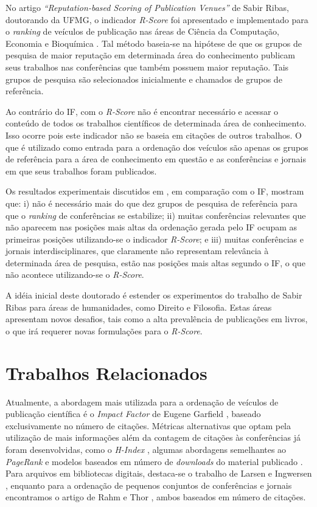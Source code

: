 \documentclass[a4paper,12pt,titlepage]{article}
\begin{document}
No artigo \textit{``Reputation-based Scoring of Publication Venues''} de Sabir Ribas, doutorando da UFMG, o indicador \textit{R-Score} foi apresentado e implementado para o \textit{ranking} de veículos de publicação nas áreas de Ciência da Computação, Economia e Bioquímica \cite{sabir}. Tal método baseia-se na hipótese de que os grupos de pesquisa de maior reputação em determinada área do conhecimento publicam seus trabalhos nas conferências que também possuem maior reputação. Tais grupos de pesquisa são selecionados inicialmente e chamados de grupos de referência. 

Ao contrário do IF, com o \textit{R-Score} não é encontrar necessário e acessar o conteúdo de todos os trabalhos científicos de determinada área de conhecimento. Isso ocorre pois este indicador não se baseia em citações de outros trabalhos. O que é utilizado como entrada para a ordenação dos veículos são apenas os grupos de referência para a área de conhecimento em questão e as conferências e jornais em que seus trabalhos foram publicados.

Os resultados experimentais discutidos em \cite{sabir}, em comparação com o IF, mostram que: i) não é necessário mais do que dez grupos de pesquisa de referência para que o \textit{ranking} de conferências se estabilize; ii) muitas conferências relevantes que não aparecem nas posições mais altas da ordenação gerada pelo IF ocupam as primeiras posições utilizando-se o indicador \textit{R-Score}; e iii) muitas conferências e jornais interdisciplinares, que claramente não representam relevância à determinada área de pesquisa, estão nas posições mais altas segundo o IF, o que não acontece utilizando-se o \textit{R-Score}.

A idéia inicial deste doutorado é estender os experimentos do trabalho de Sabir Ribas para áreas de humanidades, como Direito e Filosofia. Estas áreas apresentam novos desafios, tais como a alta prevalência de publicações em livros, o que irá requerer novas formulações para o \textit{R-Score}.

\section{Trabalhos Relacionados} 
Atualmente, a abordagem mais utilizada para a ordenação de veículos de publicação científica é o \textit{Impact Factor} de Eugene Garfield \cite{if}, baseado exclusivamente no número de citações. Métricas alternativas que optam pela utilização de mais informações além da contagem de citações às conferências já foram desenvolvidas, como o  \textit{H-Index} \cite{h-index}, algumas abordagens semelhantes ao  \textit{PageRank} \cite{pagerank} e modelos baseados em número de \textit{downloads} do material publicado \cite{downloads}. Para arquivos em bibliotecas digitais, destaca-se o trabalho de Larsen e Ingwersen \cite{larsen}, enquanto para a ordenação de pequenos conjuntos de conferências e jornais encontramos o artigo de Rahm e Thor \cite{rahm}, ambos baseados em número de citações.
\end{document}
